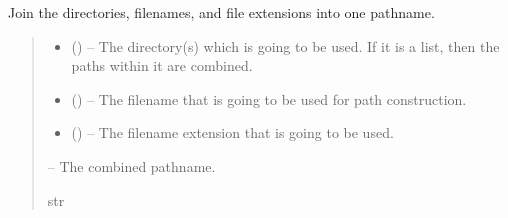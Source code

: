 \documentclass[letterpaper,11pt,english]{sphinxmanual}
\begin{document}
\begin{savenotes}\begin{fulllineitems}
\label{\detokenize{code/lezargus.library.path:lezargus.library.path.merge_pathname}}
\pysigstartsignatures
{}
\pysigstopsignatures
\sphinxAtStartPar
Join the directories, filenames, and file extensions into one pathname.
\begin{quote}\begin{description}
\begin{itemize}
\item {} 
\sphinxAtStartPar
{} (\sphinxstyleliteralemphasis{\sphinxupquote{, }}) – The directory(s) which is going to be used. If it is a list,
then the paths within it are combined.

\item {} 
\sphinxAtStartPar
{} (\sphinxstyleliteralemphasis{\sphinxupquote{, }}) – The filename that is going to be used for path construction.

\item {} 
\sphinxAtStartPar
{} (\sphinxstyleliteralemphasis{\sphinxupquote{, }}) – The filename extension that is going to be used.

\end{itemize}

\sphinxAtStartPar
{} – The combined pathname.

\sphinxAtStartPar
str

\end{description}\end{quote}

\end{fulllineitems}\end{savenotes}
\end{document}

